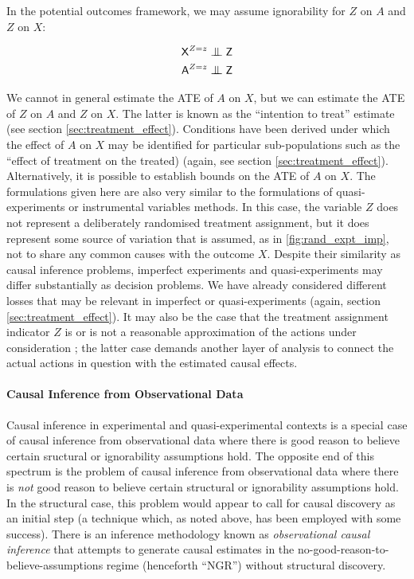 In the potential outcomes framework, we may assume ignorability for $Z$ on $A$ and $Z$ on $X$:

\begin{align}
    \RV{X}^{Z=z} &\CI \RV{Z}\\
    \RV{A}^{Z=z} &\CI \RV{Z}
\end{align}

We cannot in general estimate the ATE of $A$ on $X$, but we can estimate the ATE of $Z$ on $A$ and $Z$ on $X$. The latter is known as the ``intention to treat'' estimate (see section \ref{sec:treatment_effect}). Conditions have been derived under which the effect of $A$ on $X$ may be identified for particular sub-populations such as the ``effect of treatment on the treated) (again, see section \ref{sec:treatment_effect})\cite{angrist_identification_1996,pearl_causality:_2009}. Alternatively, it is possible to establish bounds on the ATE of $A$ on $X$\cite{balke_bounds_1997}. The formulations given here are also very similar to the formulations of quasi-experiments or instrumental variables methods\cite{angrist_instrumental_2001}. In this case, the variable $Z$ does not represent a deliberately randomised treatment assignment, but it does represent some source of variation that is assumed, as in \ref{fig:rand_expt_imp}, not to share any common causes with the outcome $X$\cite{angrist_mastering_2014}. Despite their similarity as causal inference problems, imperfect experiments and quasi-experiments may differ substantially as decision problems. We have already considered different losses that may be relevant in imperfect or quasi-experiments (again, section \ref{sec:treatment_effect}). It may also be the case that the treatment assignment indicator $Z$ is or is not a reasonable approximation of the actions under consideration \cite{heckman_randomization_1991}; the latter case demands another layer of analysis to connect the actual actions in question with the estimated causal effects.

\paragraph{Causal Inference from Observational Data}

Causal inference in experimental and quasi-experimental contexts is a special case of causal inference from observational data where there is good reason to believe certain sructural or ignorability assumptions hold. The opposite end of this spectrum is the problem of causal inference from observational data where there is \emph{not} good reason to believe certain structural or ignorability assumptions hold. In the structural case, this problem would appear to call for causal discovery as an initial step (a technique which, as noted above, has been employed with some success). There is an inference methodology known as \emph{observational causal inference} that attempts to generate causal estimates in the no-good-reason-to-believe-assumptions regime (henceforth ``NGR'') without structural discovery.


